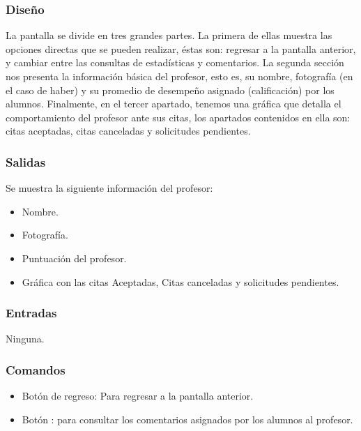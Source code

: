\subsubsection{Diseño}
	\noindent
	La pantalla se divide en tres grandes partes. La primera de ellas muestra las opciones directas que se pueden realizar, éstas son: regresar a la pantalla anterior, y cambiar entre las consultas de estadísticas y comentarios. La segunda sección nos presenta la información básica del profesor, esto es, su nombre, fotografía (en el caso de haber) y su promedio de desempeño asignado (calificación) por los alumnos. Finalmente, en el tercer apartado, tenemos una gráfica que detalla el comportamiento del profesor ante sus citas, los apartados contenidos en ella son: citas aceptadas, citas canceladas y solicitudes pendientes. 

\pagebreak
{}

\subsubsection{Salidas}
	\noindent
	Se muestra la siguiente información del profesor:
	\begin{itemize} 
		\item Nombre.
		\item Fotografía.
		\item Puntuación del profesor.
		\item Gráfica con las citas Aceptadas, Citas canceladas y solicitudes pendientes.
	\end{itemize}

\subsubsection{Entradas}
	\noindent
	Ninguna.

\subsubsection{Comandos}
	\begin{itemize}
		\item Botón de regreso: Para regresar a la pantalla anterior.
		\item Botón  : para consultar los comentarios asignados por los alumnos al profesor.
	\end{itemize}

